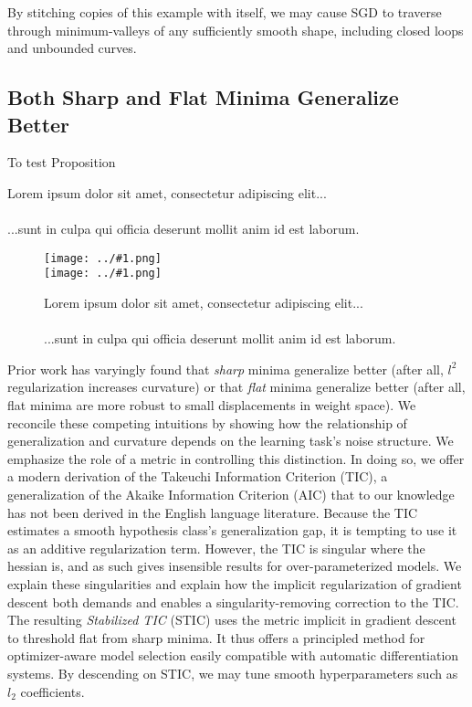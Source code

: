 \documentclass{article}
\newcommand{\plotmoo}[3]{
    \texttt{[image: ../\#1.png]}
}
\newcommand{\lorem}[1]{
    Lorem ipsum dolor sit amet, consectetur adipiscing elit...\\
    \nopagebreak\vspace{#1cm} \ \\
    ...sunt in culpa qui officia deserunt mollit anim id est laborum.
}
\begin{document}
        By stitching copies of this example with itself, we may cause SGD to
        traverse through minimum-valleys of any sufficiently smooth shape,
        including closed loops and unbounded curves. 


    \subsection{Both Sharp and Flat Minima Generalize Better}
        To test Proposition \label{prop:overfit} 
        \lorem{3}
        \begin{figure}[h!]
            \centering
            \plotmoo{plots/tak}{0.98\columnwidth}{4.0cm} \\
            \plotmoo{plots/tak-reg}{0.98\columnwidth}{4.0cm}
            \caption{\lorem{2}}
        \end{figure}

    Prior work has varyingly found that \emph{sharp} minima generalize better
    (after all, $l^2$ regularization increases curvature) or that \emph{flat}
    minima generalize better (after all, flat minima are more robust to small
    displacements in weight space).  We reconcile these competing intuitions by
    showing how the relationship of generalization and curvature depends on the
    learning task's noise structure.  We emphasize the role of a metric in
    controlling this distinction.  In doing so, we offer a modern derivation of
    the Takeuchi Information Criterion (TIC), a generalization of the Akaike
    Information Criterion (AIC) that to our knowledge has not been derived in
    the English language literature.  Because the TIC estimates a smooth
    hypothesis class's generalization gap, it is tempting to use it as an
    additive regularization term.  However, the TIC is singular where the
    hessian is, and as such gives insensible results for over-parameterized
    models.  We explain these singularities and explain how the implicit
    regularization of gradient descent both demands and enables a
    singularity-removing correction to the TIC.  The resulting \emph{Stabilized
    TIC} (STIC) uses the metric implicit in gradient descent to threshold flat
    from sharp minima.  It thus offers a principled method for optimizer-aware
    model selection easily compatible with automatic differentiation systems.
    By descending on STIC, we may tune smooth hyperparameters such as $l_2$
    coefficients.
\end{document}
